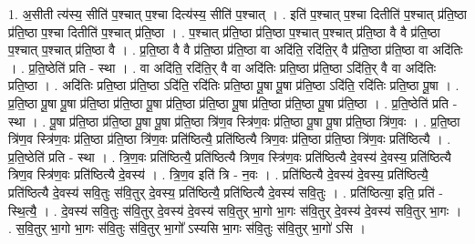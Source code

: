\documentclass[17pt]{extarticle}
\begin{document}
1. अ॒सीती त्य॑स्य॒ सीति॑ प॒श्चात् प॒श्चा दित्य॑स्य॒ सीति॑ प॒श्चात् । . इति॑ प॒श्चात् प॒श्चा दितीति॑ प॒श्चात् प्र॑ति॒ष्ठा प्र॑ति॒ष्ठा प॒श्चा दितीति॑ प॒श्चात् प्र॑ति॒ष्ठा । . प॒श्चात् प्र॑ति॒ष्ठा प्र॑ति॒ष्ठा प॒श्चात् प॒श्चात् प्र॑ति॒ष्ठा वै वै प्र॑ति॒ष्ठा प॒श्चात् प॒श्चात् प्र॑ति॒ष्ठा वै । . प्र॒ति॒ष्ठा वै वै प्र॑ति॒ष्ठा प्र॑ति॒ष्ठा वा अदि॑ति॒ रदि॑ति॒र् वै प्र॑ति॒ष्ठा प्र॑ति॒ष्ठा वा अदि॑तिः । . प्र॒ति॒ष्ठेति॑ प्रति - स्था । . वा अदि॑ति॒ रदि॑ति॒र् वै वा अदि॑तिः प्रति॒ष्ठा प्र॑ति॒ष्ठा ऽदि॑ति॒र् वै वा अदि॑तिः प्रति॒ष्ठा । . अदि॑तिः प्रति॒ष्ठा प्र॑ति॒ष्ठा ऽदि॑ति॒ रदि॑तिः प्रति॒ष्ठा पू॒षा पू॒षा प्र॑ति॒ष्ठा ऽदि॑ति॒ रदि॑तिः प्रति॒ष्ठा पू॒षा । . प्र॒ति॒ष्ठा पू॒षा पू॒षा प्र॑ति॒ष्ठा प्र॑ति॒ष्ठा पू॒षा प्र॑ति॒ष्ठा प्र॑ति॒ष्ठा पू॒षा प्र॑ति॒ष्ठा प्र॑ति॒ष्ठा पू॒षा प्र॑ति॒ष्ठा । . प्र॒ति॒ष्ठेति॑ प्रति - स्था । . पू॒षा प्र॑ति॒ष्ठा प्र॑ति॒ष्ठा पू॒षा पू॒षा प्र॑ति॒ष्ठा त्रि॑ण॒व स्त्रि॑ण॒वः प्र॑ति॒ष्ठा पू॒षा पू॒षा प्र॑ति॒ष्ठा त्रि॑ण॒वः । . प्र॒ति॒ष्ठा त्रि॑ण॒व स्त्रि॑ण॒वः प्र॑ति॒ष्ठा प्र॑ति॒ष्ठा त्रि॑ण॒वः प्रति॑ष्ठित्यै॒ प्रति॑ष्ठित्यै त्रिण॒वः प्र॑ति॒ष्ठा प्र॑ति॒ष्ठा त्रि॑ण॒वः प्रति॑ष्ठित्यै । . प्र॒ति॒ष्ठेति॑ प्रति - स्था । . त्रि॒ण॒वः प्रति॑ष्ठित्यै॒ प्रति॑ष्ठित्यै त्रिण॒व स्त्रि॑ण॒वः प्रति॑ष्ठित्यै दे॒वस्य॑ दे॒वस्य॒ प्रति॑ष्ठित्यै त्रिण॒व स्त्रि॑ण॒वः प्रति॑ष्ठित्यै दे॒वस्य॑ । . त्रि॒ण॒व इति॑ त्रि - न॒वः । . प्रति॑ष्ठित्यै दे॒वस्य॑ दे॒वस्य॒ प्रति॑ष्ठित्यै॒ प्रति॑ष्ठित्यै दे॒वस्य॑ सवि॒तुः स॑वि॒तुर् दे॒वस्य॒ प्रति॑ष्ठित्यै॒ प्रति॑ष्ठित्यै दे॒वस्य॑ सवि॒तुः । . प्रति॑ष्ठित्या॒ इति॒ प्रति॑ - स्थि॒त्यै॒ । . दे॒वस्य॑ सवि॒तुः स॑वि॒तुर् दे॒वस्य॑ दे॒वस्य॑ सवि॒तुर् भा॒गो भा॒गः स॑वि॒तुर् दे॒वस्य॑ दे॒वस्य॑ सवि॒तुर् भा॒गः । . स॒वि॒तुर् भा॒गो भा॒गः स॑वि॒तुः स॑वि॒तुर् भा॒गो᳚ ऽस्यसि भा॒गः स॑वि॒तुः स॑वि॒तुर् भा॒गो॑ ऽसि । \newline
\end{document}
